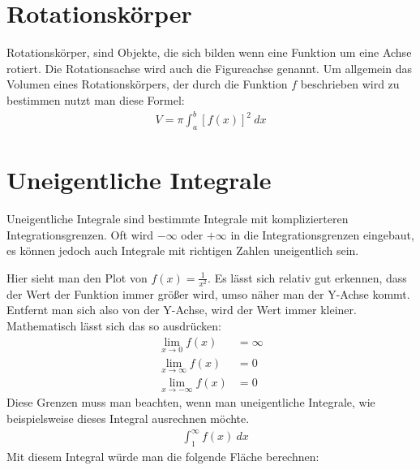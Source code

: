 \section{Rotationskörper}

\begin{flushleft}
    Rotationskörper, sind Objekte, die sich bilden wenn eine Funktion um eine Achse rotiert.
    Die Rotationsachse wird auch die Figureachse genannt.
    Um allgemein das Volumen eines Rotationskörpers, der durch die Funktion $f$ beschrieben wird zu bestimmen nutzt man diese Formel:
    \begin{align}
        V=\pi\int_{a}^{b}[f(x)]^2 \ dx
    \end{align}
\end{flushleft}

\section{Uneigentliche Integrale}

\begin{flushleft}
    Uneigentliche Integrale sind bestimmte Integrale mit komplizierteren Integrationsgrenzen.
    Oft wird $-\infty$ oder $+\infty$ in die Integrationsgrenzen eingebaut, es können jedoch auch Integrale mit richtigen Zahlen uneigentlich sein.
\end{flushleft}

\begin{center}
\end{center}

\begin{flushleft}
    Hier sieht man den Plot von $f(x)=\frac{1}{x^2}$.
    Es lässt sich relativ gut erkennen, dass der Wert der Funktion immer größer wird, umso näher man der Y-Achse kommt.
    Entfernt man sich also von der Y-Achse, wird der Wert immer kleiner.
    Mathematisch lässt sich das so ausdrücken:
    \begin{align}
        \lim_{x \to 0} f(x) &= \infty \\
        \lim_{x \to \infty} f(x) &= 0 \\
        \lim_{x \to -\infty} f(x) &= 0
    \end{align}
    Diese Grenzen muss man beachten, wenn man uneigentliche Integrale, wie beispielsweise dieses Integral ausrechnen möchte.
    \begin{align}
        &\int_{1}^{\infty} f(x) \ dx
    \end{align}
    Mit diesem Integral würde man die folgende Fläche berechnen:
\end{flushleft}

